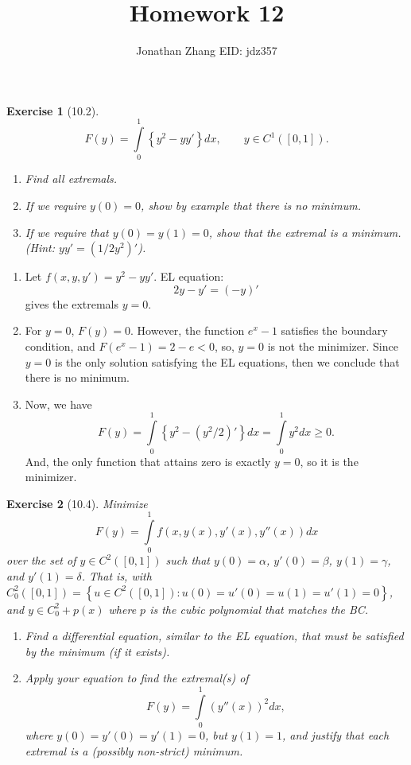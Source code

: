 \documentclass[letterpaper,twoside,11pt]{article}
\theoremstyle{mystyle}
\newtheorem*{exercise}{Exercise}
\newcommand{\cbk}{\color{black}}
\newcommand{\cblu}{\color{blue}}
\begin{document}
\selectfont     %
\title{\vspace{-2\baselineskip} 
Homework 12
}
\author{Jonathan Zhang \qquad EID: { jdz357} }
\date{}
\maketitle


\begin{exercise}[10.2]
  \[F(y) = \int\limits_0^1 \left\{ y^2 - yy' \right\}dx, \qquad y \in C^1 \left( [0,1] \right).\]
  \begin{enumerate}
    \item Find all extremals. 
    \item If we require $y(0) = 0$, show by example that there is no minimum. 
    \item If we require that $y(0) = y(1) = 0$, show that the extremal is a minimum. (Hint: $yy' = \left( 1/2 y^2  \right)'$).
  \end{enumerate}
\end{exercise}

\cblu 

\begin{enumerate}
  \item Let \(f(x, y, y') = y^2 - yy'\). EL equation:
  \[2y-y'=\left( -y \right)'\]
  gives the extremals $y = 0$. 
  \item For $y = 0$, $F(y) = 0$. However, the function $e^x - 1$ satisfies the boundary condition, and $F(e^x - 1)=2-e < 0$, so, $y = 0$ is not the minimizer. Since $y = 0$ is the only solution satisfying the EL equations, then we conclude that there is no minimum.  
  \item Now, we have 
  \[F(y) = \int\limits_0^1 \left\{ y^2 - (y^2/2)' \right\}dx = \int\limits_0^1 y^2 dx \geq 0. \]
  And, the only function that attains zero is exactly $y = 0$, so it is the minimizer. 
\end{enumerate}

\cbk 

\begin{exercise}[10.4]
  Minimize 
  \[F(y) = \int\limits_0^1 f(x, y(x), y'(x), y''(x)) dx\]
  over the set of $y \in C^2([0,1])$ such that $y(0) = \alpha$, $y'(0) = \beta$, $y(1) = \gamma$, and $y'(1) = \delta$. That is, with $C_0^2([0,1]) = \left\{ u \in C^2 ([0,1]) : u(0) = u'(0) = u(1) = u'(1) = 0 \right\}$, and $y \in C_0^2 + p(x)$ where $p$ is the cubic polynomial that matches the BC. 
  \begin{enumerate}
    \item Find a differential equation, similar to the EL equation, that must be satisfied by the minimum (if it exists). 
    \item Apply your equation to find the extremal(s) of 
    \[F(y) = \int\limits_0^1 \left( y''(x) \right)^2 dx,\]
    where $y(0) = y'(0) = y'(1) = 0$, but $y(1) = 1$, and justify that each extremal is a (possibly non-strict) minimum. 
  \end{enumerate}
\end{exercise}
\end{document}
